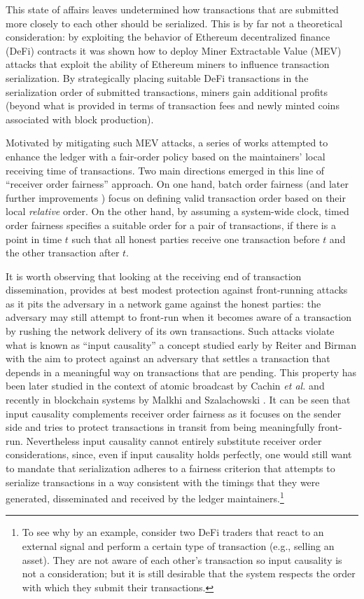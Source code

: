 This state of affairs leaves undetermined how transactions that are submitted more closely to each other should be serialized.
%
This is by far not a theoretical consideration: by exploiting the behavior of Ethereum decentralized finance (DeFi) contracts
it was shown how to deploy Miner Extractable Value (MEV) attacks \cite{SP:DGKLZB20} that exploit the ability of Ethereum miners to influence transaction serialization.
%
By strategically placing suitable DeFi transactions in the serialization order of submitted transactions, miners gain additional profits (beyond what is provided in terms of transaction fees and newly minted coins associated with block production).

Motivated by mitigating such MEV attacks, a series of works attempted to enhance the ledger with a fair-order policy based on the maintainers' local receiving time of transactions.
%
Two main directions emerged in this line of ``receiver order fairness'' approach.
%
On one hand, batch order fairness \cite{C:KZGJ20,ACCS:KDK22} (and later further improvements \cite{FC:CMSZ22,EC:KiaLeoShe24}) focus on defining valid transaction order based on their local \emph{relative} order.
%
On the other hand, by assuming a system-wide clock, timed order fairness \cite{AFT:Kursawe20,OSDI:ZSCZA20} specifies a suitable order for a pair of transactions, if there is a point in time $t$ such that all honest parties receive one transaction before $t$ and the other transaction after $t$.

It is worth observing that looking at the receiving end of transaction dissemination, provides at best modest protection against front-running attacks as it pits the adversary in a network game against the honest parties: the adversary may still attempt to front-run when it becomes aware of a transaction by rushing the network delivery of its own transactions.
%
Such attacks violate what is known as ``input causality'' a concept studied early by Reiter and Birman \cite{ReiBir94} with the aim to protect against an adversary that settles a transaction that depends in a meaningful way on transactions that are pending.
%
This property has been later studied in the context of atomic broadcast by Cachin \textit{et al.} \cite{C:CKPS01} and recently in blockchain systems by Malkhi and Szalachowski \cite{TOKENOMICS:MalSza23}.
%
It can be seen that input causality complements receiver order fairness as it focuses on the sender side and tries to protect transactions in transit from being meaningfully front-run.
%
Nevertheless input causality cannot entirely substitute receiver order considerations, since, even if input causality holds perfectly, one would still want to mandate that serialization adheres to a fairness criterion that attempts to serialize transactions in a way consistent with the timings that they were generated, disseminated and received by the ledger maintainers.\footnote{To see why by an example, consider two DeFi traders that react to an external signal and perform a certain type of transaction (e.g., selling an asset). They are not aware of each other's transaction so input causality is not a consideration; but it is still desirable that the system respects the order with which they submit their transactions. }


